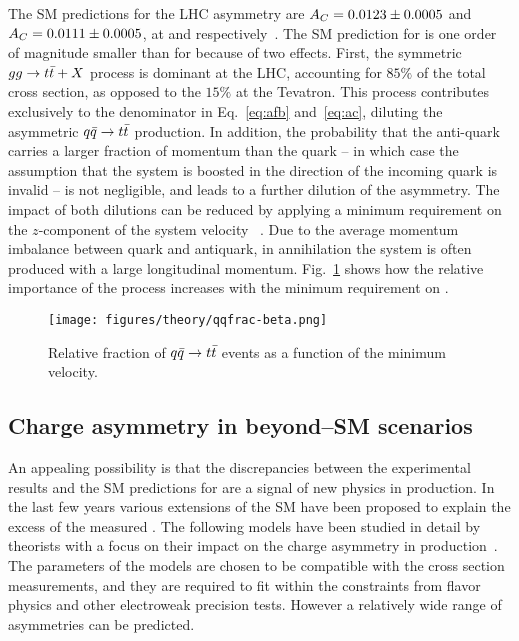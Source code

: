 The SM predictions for the LHC asymmetry are \mbox{$A_C{}=0.0123\pm{}0.0005$}
and \mbox{$A_C{}=0.0111\pm0.0005$}, at \seventev{} and \eighttev{}
respectively~\cite{Bernreuther:2012sx}.  
The SM prediction for \ac{} is one order of magnitude smaller than for
\afb{} because of two effects. First, the symmetric $gg\to t\bar{t}{}+X$
process is dominant at the LHC, accounting for $85\%$ of the total
cross section, as opposed to the $15\%$ at the Tevatron. This process
contributes exclusively to the denominator in Eq.~\ref{eq:afb}
and~\ref{eq:ac}, diluting the asymmetric \mbox{$q\bar{q}{}\to t\bar{t}{}$}
production. In addition, the probability that the anti-quark carries a
larger fraction of momentum than the quark -- in which case the
assumption that the \ttbar{} system is boosted in the direction of the
incoming quark is invalid -- is not negligible, and leads to a further
dilution of the asymmetry. The impact of both dilutions can be reduced
by applying a minimum requirement on the $z$-component of the \ttbar{}
system velocity \betatt{}~\cite{AguilarSaavedra:2011cp}. Due to the
average momentum imbalance between quark and antiquark, in \qqbar{}
annihilation the \ttbar{} system is often produced with a large longitudinal
momentum. Fig.~\ref{fig:qqbarfrac} shows how the relative importance
of the \qqbar{} process increases with the minimum requirement on \betatt{}.

\begin{figure}[!htb]
  \centering
  \texttt{[image: figures/theory/qqfrac-beta.png]} 
  \caption{Relative fraction of $q\bar{q}{}\to t\bar{t}{}$ events as a function of the
    minimum \ttbar{} velocity.} 
  \label{fig:qqbarfrac}
\end{figure}

\subsection{Charge asymmetry in beyond--SM scenarios}
\label{sec:bsmca}

An appealing possibility is that the discrepancies between the
experimental results and the SM predictions for \afb{} are a signal of
new physics in \ttbar{} production. In the last few years various
extensions of the SM have been proposed to explain the excess of the
measured \afb{}. The following models have been studied in
detail by theorists with a focus on their impact on the charge
asymmetry in \ttbar{} production~\cite{Aguilar-Saavedra:2014kpa}. The
parameters of the models are chosen to be compatible with the \ttbar{}
cross section measurements, and they are required to fit within the
constraints from flavor physics and other electroweak precision
tests. However a relatively wide range of asymmetries can be predicted.

